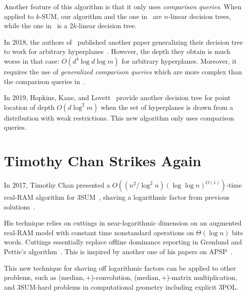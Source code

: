 Another feature of this algorithm is that it only uses \emph{comparison
queries}. When applied to \(k\)-SUM, our algorithm and the one in~\cite{ES17} are \(n\)-linear
decision trees, while the one in~\cite{KLM18} is a \(2k\)-linear decision tree.

In 2018, the authors of~\cite{KLM18} published another paper generalizing their
decision tree to work for arbitrary hyperplanes~\cite{KLM18b}. However,
the depth they obtain is much worse in that case: $O(d^4 \log d \log m)$ for
arbitrary hyperplanes. Moreover, it requires the use of \emph{generalized
comparison queries} which are more complex than the comparison queries
in~\cite{KLM18}.

In 2019,  Hopkins, Kane, and Lovett~\cite{HKL19} provide another decision
tree for point location of depth \(O(d \log^2 m)\) when the set of
hyperplanes is drawn from a distribution with weak restrictions. This new
algorithm only uses comparison queries.

\section{Timothy Chan Strikes Again}%
\label{sec:developments:3pol-algorithm}

In 2017, Timothy Chan presented a
\(O((n^2 / \log^2 n)(\log \log n)^{O(1)})\)-time real-RAM algorithm for
3SUM~\cite{Ch18}, shaving a logarithmic factor from previous solutions~\cite{Fr15,GS15}.

His technique relies on cuttings in near-logarithmic dimension on an augmented
real-RAM model with constant time nonstandard operations on $\Theta(\log n)$
bits words. Cuttings essentially replace offline dominance reporting in Gr\o nlund and
Pettie's algorithm~\cite{GP18}.
This is inspired by another one of his papers on APSP~\cite{Cha10}.

This new technique for shaving off logarithmic factors
can be applied to other problems, such as (\(\text{median}, +\))-convolution,
(\(\text{median}, +\))-matrix multiplication, and 3SUM-hard problems in
computational geometry including explicit 3POL.
